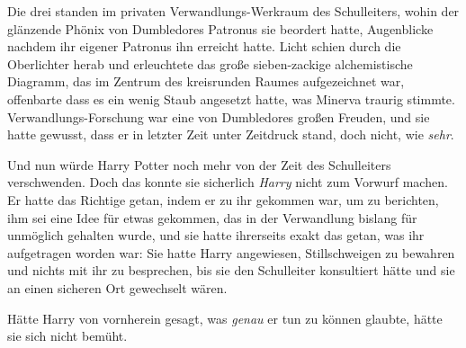Die drei standen im privaten Verwandlungs-Werkraum des Schulleiters, wohin der glänzende Phönix von Dumbledores Patronus sie beordert hatte, Augenblicke nachdem ihr eigener Patronus ihn erreicht hatte. Licht schien durch die Oberlichter herab und erleuchtete das große sieben-zackige alchemistische Diagramm, das im Zentrum des kreisrunden Raumes aufgezeichnet war, offenbarte dass es ein wenig Staub angesetzt hatte, was Minerva traurig stimmte. Verwandlungs-Forschung war eine von Dumbledores großen Freuden, und sie hatte gewusst, dass er in letzter Zeit unter Zeitdruck stand, doch nicht, wie \emph{sehr}.

Und nun würde Harry Potter noch mehr von der Zeit des Schulleiters verschwenden. Doch das konnte sie sicherlich \emph{Harry} nicht zum Vorwurf machen. Er hatte das Richtige getan, indem er zu ihr gekommen war, um zu berichten, ihm sei eine Idee für etwas gekommen, das in der Verwandlung bislang für unmöglich gehalten wurde, und sie hatte ihrerseits exakt das getan, was ihr aufgetragen worden war: Sie hatte Harry angewiesen, Stillschweigen zu bewahren und nichts mit ihr zu besprechen, bis sie den Schulleiter konsultiert hätte und sie an einen sicheren Ort gewechselt wären.

Hätte Harry von vornherein gesagt, was \emph{genau} er tun zu können glaubte, hätte sie sich nicht bemüht.

